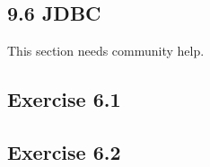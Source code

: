 \documentclass[../../main.tex]{subfiles}
\begin{document}
\subsection{9.6 JDBC}

This section needs community help.

\subsection*{Exercise 6.1}

\subsection*{Exercise 6.2}
\end{document}
